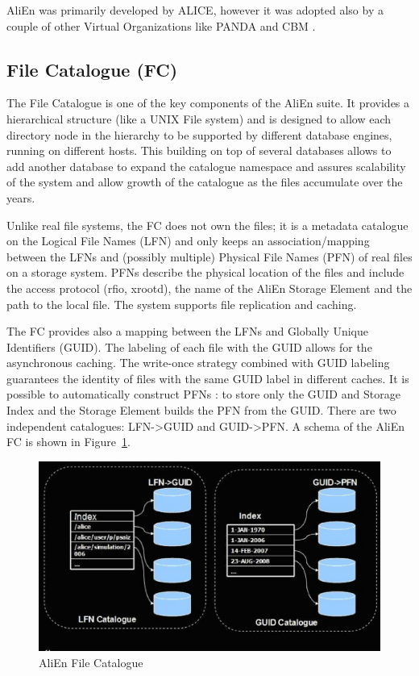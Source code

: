AliEn was primarily developed by ALICE, however it was adopted also
by a couple of other Virtual Organizations like PANDA \cite{PANDA} and CBM \cite{CBM}.

\subsection{File Catalogue (FC)}
%
The File Catalogue is one of the key components of the AliEn suite.
It provides a hierarchical structure (like a UNIX File system) and
is designed to allow each directory node in the hierarchy to be
supported by different database engines, running on different hosts.
This building on top of several databases allows to add another
database to expand the catalogue namespace and assures scalability
of the system and allow growth of the catalogue as the files
accumulate over the years.

Unlike real file systems, the FC does not own the files; it is a
metadata catalogue on the Logical File Names (LFN) and only keeps an
association/mapping between the LFNs and (possibly multiple)
Physical File Names (PFN) of real files on a storage system. PFNs
describe the physical location of the files and include the access
protocol (rfio, xrootd), the name of the AliEn Storage Element and
the path to the local file. The system supports file replication and
caching.

The FC provides also a mapping between the LFNs and Globally Unique
Identifiers (GUID). The labeling of each file with the GUID allows
for the asynchronous caching. The write-once strategy combined with
GUID labeling guarantees the identity of files with the same GUID
label in different caches. It is possible to automatically construct
PFNs : to store only the GUID and Storage Index and the Storage
Element builds the PFN from the GUID. There are two independent
catalogues: LFN->GUID and GUID->PFN. A schema of the AliEn FC is
shown in Figure~\ref{fig15}.

\begin{figure}[htb] %
\centering
\includegraphics[width=13cm]{fig15.eps} %
\caption{AliEn File Catalogue}\label{fig15}
\end{figure}

